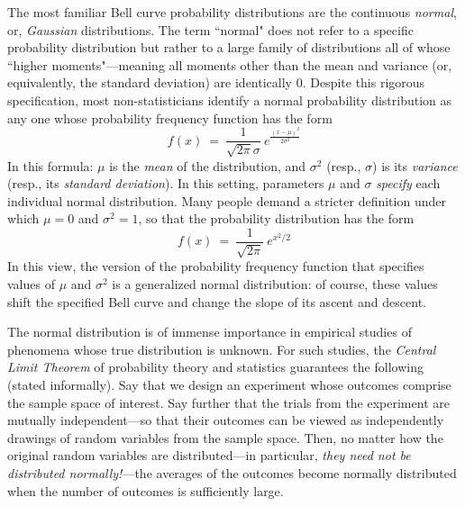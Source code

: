 \bigskip

The most familiar Bell curve probability distributions are the continuous {\em normal}, or, {\it Gaussian} distributions.  The term ``normal" does not refer to a specific probability distribution but rather to a large family of distributions all of whose ``higher moments"---meaning all moments other than the mean and variance (or, equivalently, the standard deviation) are identically $0$.  Despite this rigorous specification, most non-statisticians identify a normal probability distribution as any one whose probability frequency function has the form
\[ f(x) \ = \ \frac{1}{\sqrt{2 \pi} \sigma} \ e^{\frac{(x - \mu)^2}{2 \sigma^2} } \]
In this formula: $\mu$ is the {\it mean} of the distribution, and $\sigma^2$ (resp., $\sigma$) is its {\it variance} (resp., its {\it standard deviation}).  In this setting, parameters $\mu$ and $\sigma$ {\em specify} each individual normal distribution.  Many people demand a stricter definition under which $\mu = 0$ and $\sigma^2 = 1$, so that the probability distribution has the form
\[ f(x) \ = \ \frac{1}{\sqrt{2 \pi}} \ e^{x^2/2} \]
In this view, the version of the probability frequency function that specifies values of $\mu$ and $\sigma^2$ is a generalized normal distribution: of course, these values shift the specified Bell curve and change the slope of its ascent and descent.

\bigskip

\noindent {}

\bigskip

 

The normal distribution is of immense importance in empirical studies of phenomena whose true distribution is unknown.  For such studies, the {\em Central Limit Theorem} of probability theory and statistics guarantees the following (stated informally).  Say that we design an experiment whose outcomes comprise the sample space of interest.  Say further that the trials from the experiment are mutually
independent---so that their outcomes can be viewed as independently drawings of random variables from the sample space.  Then, no matter how the original random variables are distributed---in particular,
{\em they need not be distributed normally!}---the averages of the outcomes become normally distributed when the number of outcomes is sufficiently large.  


